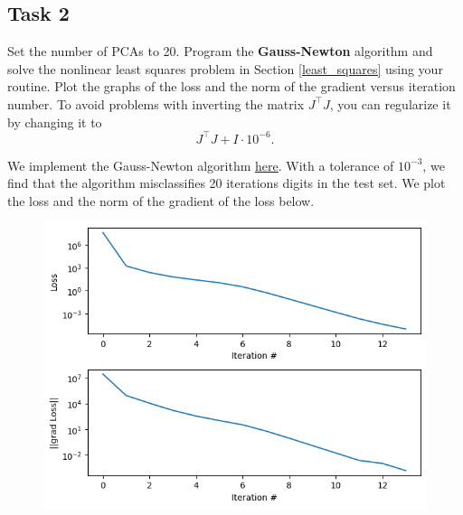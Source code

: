 \documentclass{../kin_math}
\begin{document}
\subsection{Task 2}
Set the number of PCAs to 20. Program the \textbf{Gauss-Newton} algorithm and solve the nonlinear least squares problem in Section \ref{least_squares} using your routine. Plot the graphs of the loss and the norm of the gradient versus iteration number. To avoid problems with inverting the matrix $J^\top J$, you can regularize it by changing it to
\begin{equation*}
  J^\top J + I \cdot 10^{-6}.
\end{equation*}
\begin{solution}
  We implement the Gauss-Newton algorithm \href{https://github.com/elijahkin/amsc660/blob/main/hw12/hw12.ipynb}{here}. With a tolerance of $10^{-3}$, we find that the algorithm misclassifies 20 iterations digits in the test set. We plot the loss and the norm of the gradient of the loss below.
  \begin{figure}
    \centering
    \includegraphics[scale=0.8]{gauss_newton.png}
  \end{figure}
\end{solution}
\end{document}
